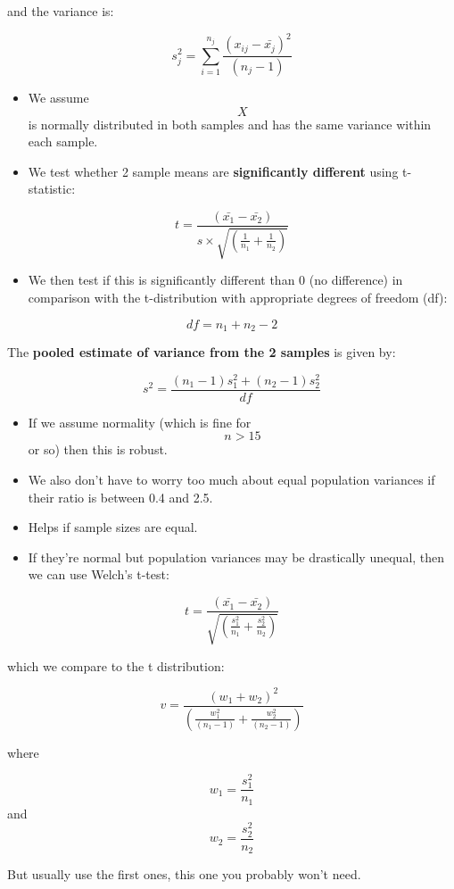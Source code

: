 and the variance is:

\[s_j^2 = \sum_{i = 1}^{n_j} \frac{(x_{ij} - \bar{x_j})^2}{(n_j - 1)}\]

\begin{itemize}
\tightlist
\item
  We assume \[X\] is normally distributed in both samples and has the
  same variance within each sample.
\item
  We test whether 2 sample means are \textbf{significantly different}
  using t-statistic:
\end{itemize}

\[t = \frac{(\bar{x_1} - \bar{x_2})}{s \times \sqrt{(\frac{1}{n_1} + \frac{1}{n_2})}}\]

\begin{itemize}
\tightlist
\item
  We then test if this is significantly different than 0 (no difference)
  in comparison with the t-distribution with appropriate degrees of
  freedom (df):
\end{itemize}

\[ df = n_1 + n_2 - 2 \]

The \textbf{pooled estimate of variance from the 2 samples} is given by:

\[s^2 = \frac{(n_1 - 1)s_1^2 + (n_2 - 1)s_2^2}{df}\]

\begin{itemize}
\tightlist
\item
  If we assume normality (which is fine for \[ n > 15 \] or so) then
  this is robust.
\item
  We also don't have to worry too much about equal population variances
  if their ratio is between 0.4 and 2.5.
\item
  Helps if sample sizes are equal.
\item
  If they're normal but population variances may be drastically unequal,
  then we can use Welch's t-test:
\end{itemize}

\[t = \frac{(\bar{x_1} - \bar{x_2})}{\sqrt{(\frac{s_1^2}{n_1} + \frac{s_2^2}{n_2})}}\]

which we compare to the t distribution:

\[v = \frac{(w_1 + w_2)^2}{(\frac{w_1^2}{(n_1 - 1)} + \frac{w_2^2}{(n_2 - 1)})}\]

where

\[w_1 = \frac{s_1^2}{n_1}\] and \[w_2 = \frac{s_2^2}{n_2}\]

But usually use the first ones, this one you probably won't need.

